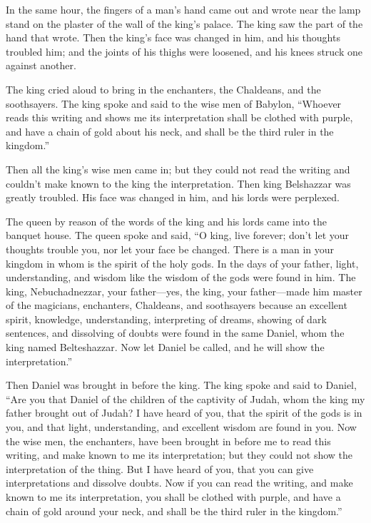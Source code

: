  In the same hour, the fingers of a man's hand came out
and wrote near the lamp stand on the plaster of the wall of the king's
palace. The king saw the part of the hand that wrote. 
Then the king's face was changed in him, and his thoughts troubled him;
and the joints of his thighs were loosened, and his knees struck one
against another.

 The king cried aloud to bring in the enchanters, the
Chaldeans, and the soothsayers. The king spoke and said to the wise men
of Babylon, ``Whoever reads this writing and shows me its interpretation
shall be clothed with purple, and have a chain of gold about his neck,
and shall be the third ruler in the kingdom.''

 Then all the king's wise men came in; but they could not
read the writing and couldn't make known to the king the interpretation.
 Then king Belshazzar was greatly troubled. His face was
changed in him, and his lords were perplexed.

 The queen by reason of the words of the king and his
lords came into the banquet house. The queen spoke and said, ``O king,
live forever; don't let your thoughts trouble you, nor let your face be
changed.  There is a man in your kingdom in whom is the
spirit of the holy gods. In the days of your father, light,
understanding, and wisdom like the wisdom of the gods were found in him.
The king, Nebuchadnezzar, your father---yes, the king, your
father---made him master of the magicians, enchanters, Chaldeans, and
soothsayers  because an excellent spirit, knowledge,
understanding, interpreting of dreams, showing of dark sentences, and
dissolving of doubts were found in the same Daniel, whom the king named
Belteshazzar. Now let Daniel be called, and he will show the
interpretation.''

 Then Daniel was brought in before the king. The king
spoke and said to Daniel, ``Are you that Daniel of the children of the
captivity of Judah, whom the king my father brought out of Judah?
 I have heard of you, that the spirit of the gods is in
you, and that light, understanding, and excellent wisdom are found in
you.  Now the wise men, the enchanters, have been brought
in before me to read this writing, and make known to me its
interpretation; but they could not show the interpretation of the thing.
 But I have heard of you, that you can give
interpretations and dissolve doubts. Now if you can read the writing,
and make known to me its interpretation, you shall be clothed with
purple, and have a chain of gold around your neck, and shall be the
third ruler in the kingdom.''

